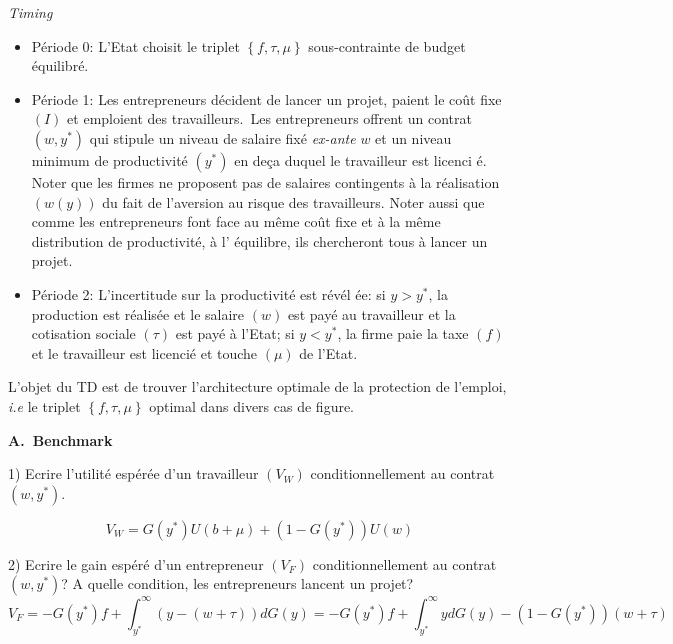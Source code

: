 \documentclass[a4paper]{article}
\begin{document}
\textit{Timing}

\begin{itemize}
\item P\'{e}riode 0: L'Etat choisit le triplet $\left\{ f,\tau ,\mu \right\} 
$ sous-contrainte de budget \'{e}quilibr\'{e}.

\item P\'{e}riode 1: Les entrepreneurs d\'{e}cident de lancer un projet,
paient le co\^{u}t fixe $(I)$ et emploient des travailleurs.\ Les
entrepreneurs offrent un contrat $\left( w,y^{\ast }\right) $ qui stipule un
niveau de salaire fix\'{e} \textit{ex-ante} $w$ et un niveau minimum de
productivit\'{e} $(y^{\ast })$ en de\c{c}a duquel le travailleur est licenci%
\'{e}. Noter que les firmes ne proposent pas de salaires contingents \`{a}
la r\'{e}alisation $(w(y))$ du fait de l'aversion au risque des
travailleurs. Noter aussi que comme les entrepreneurs font face au m\^{e}me
co\^{u}t fixe et \`{a} la m\^{e}me distribution de productivit\'{e}, \`{a} l'%
\'{e}quilibre, ils chercheront tous \`{a} lancer un projet.

\item P\'{e}riode 2: L'incertitude sur la productivit\'{e} est r\'{e}v\'{e}l%
\'{e}e: si $y>y^{\ast }$, la production est r\'{e}alis\'{e}e et le salaire $%
\left( w\right) $ est pay\'{e} au travailleur et la cotisation sociale $%
\left( \tau \right) $ est pay\'{e} \`{a} l'Etat; si $y<y^{\ast }$, la firme
paie la taxe $\left( f\right) $ et le travailleur est licenci\'{e} et touche 
$\left( \mu \right) $ de l'Etat.
\end{itemize}

\bigskip

L'objet du TD est de trouver l'architecture optimale de la protection de
l'emploi, \textit{i.e }le triplet $\left\{ f,\tau ,\mu \right\} $ optimal
dans divers cas de figure.

\bigskip

\textbf{A.\ Benchmark}

\bigskip

1) Ecrire l'utilit\'{e} esp\'{e}r\'{e}e d'un travailleur $(V_{W})$
conditionnellement au contrat $\left( w,y^{\ast }\right) $.

\begin{equation*}
V_{W}=G(y^{\ast })U(b+\mu )+\left( 1-G(y^{\ast })\right) U(w)
\end{equation*}

\bigskip

2) Ecrire le gain esp\'{e}r\'{e} d'un entrepreneur $(V_{F})$
conditionnellement au contrat $\left( w,y^{\ast }\right) $? A quelle
condition, les entrepreneurs lancent un projet?%
\begin{equation*}
V_{F}=-G(y^{\ast })f+\int_{y^{\ast }}^{\infty }(y-(w+\tau ))dG(y)=-G(y^{\ast
})f+\int_{y^{\ast }}^{\infty }ydG(y)-\left( 1-G(y^{\ast })\right) (w+\tau )
\end{equation*}
\end{document}
